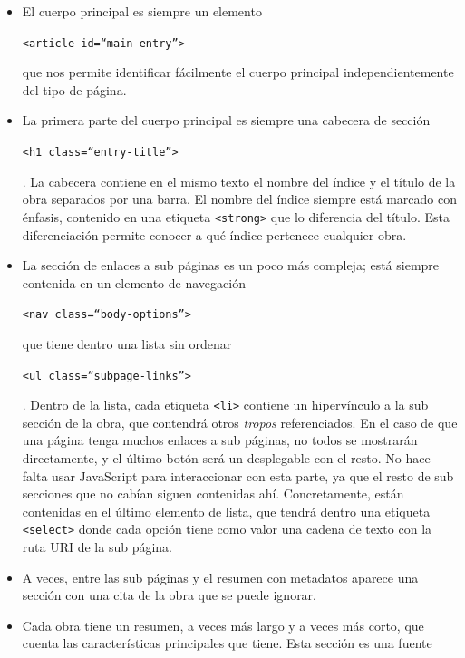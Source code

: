 \begin{itemize}
  \item El cuerpo principal es siempre un elemento
  \begin{otherlanguage}{english}\texttt{<article
  id=``main-entry''>}\end{otherlanguage} que nos permite identificar fácilmente
  el cuerpo principal independientemente del tipo de página.
  \item La primera parte del cuerpo principal es siempre una cabecera de sección
  \begin{otherlanguage}{english}\texttt{<h1
  class=``entry-title''>}\end{otherlanguage}. La cabecera contiene en el mismo
  texto el nombre del índice y el título de la obra separados por una barra. El
  nombre del índice siempre está marcado con énfasis, contenido en una etiqueta
  \texttt{<strong>} que lo diferencia del título. Esta diferenciación permite
  conocer a qué índice pertenece cualquier obra.
  \item La sección de enlaces a sub páginas es un poco más compleja; está
  siempre contenida en un elemento de navegación
  \begin{otherlanguage}{english}\texttt{<nav
  class=``body-options''>}\end{otherlanguage} que tiene dentro una lista sin
  ordenar \begin{otherlanguage}{english}\texttt{<ul
  class=``subpage-links''>}\end{otherlanguage}. Dentro de la lista, cada
  etiqueta \texttt{<li>} contiene un hipervínculo a la sub sección de la obra,
  que contendrá otros \textit{tropos} referenciados. En el caso de que una
  página tenga muchos enlaces a sub páginas, no todos se mostrarán directamente,
  y el último botón será un desplegable con el resto. No hace falta usar
  JavaScript para interaccionar con esta parte, ya que el resto de sub secciones
  que no cabían siguen contenidas ahí. Concretamente, están contenidas en el
  último elemento de lista, que tendrá dentro una etiqueta \texttt{<select>}
  donde cada opción tiene como valor una cadena de texto con la ruta URI de la
  sub página.
  \item A veces, entre las sub páginas y el resumen con metadatos aparece una
  sección con una cita de la obra que se puede ignorar.
  \item Cada obra tiene un resumen, a veces más largo y a veces más corto, que
  cuenta las características principales que tiene. Esta sección es una fuente

\end{itemize}
